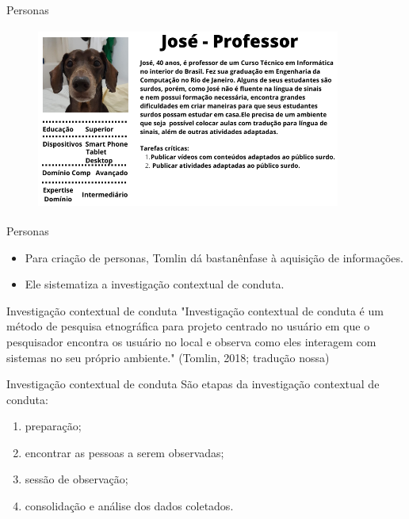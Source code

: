 \documentclass[11pt]{beamer}
\begin{document}
   \begin{frame}{Personas}
      \begin{figure}
         \includegraphics[width=10cm, height=6cm]{figures/persona.png}
      \end{figure}   
   \end{frame}

   \begin{frame}{Personas}
      \begin{itemize}
         \item Para criação de personas, Tomlin dá bastan\te ênfase à aquisição de informações.
         \item Ele sistematiza a investigação contextual de conduta.
      \end{itemize}
   \end{frame}

   \begin{frame}{Investigação contextual de conduta}
      "Investigação contextual de conduta é um método de pesquisa etnográfica para projeto centrado no usuário em que o pesquisador encontra os usuário no local e observa como eles interagem com sistemas no seu próprio ambiente." (Tomlin, 2018; tradução nossa)
   \end{frame}

   \begin{frame}{Investigação contextual de conduta}
      São etapas da investigação contextual de conduta:
      \begin{enumerate}
         \item preparação;
         \item encontrar as pessoas a serem observadas;
         \item sessão de observação;
         \item consolidação e análise dos dados coletados.
      \end{enumerate}
   \end{frame}
\end{document}
